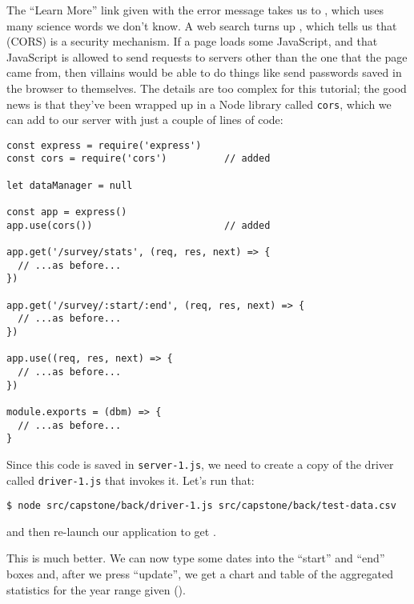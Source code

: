 \noindent
The ``Learn More'' link given with the error message takes us to
,
which uses many science words we don't know.
A web search turns up ,
which tells us that  (CORS)
is a security mechanism.
If a page loads some JavaScript,
and that JavaScript is allowed to send requests to servers other than the one that the page came from,
then villains would be able to do things like send passwords saved in the browser to themselves.
The details are too complex for this tutorial;
the good news is that they've been wrapped up in a Node library called \texttt{cors},
which we can add to our server with just a couple of lines of code:

\begin{verbatim}
const express = require('express')
const cors = require('cors')          // added

let dataManager = null

const app = express()
app.use(cors())                       // added

app.get('/survey/stats', (req, res, next) => {
  // ...as before...
})

app.get('/survey/:start/:end', (req, res, next) => {
  // ...as before...
})

app.use((req, res, next) => {
  // ...as before...
})

module.exports = (dbm) => {
  // ...as before...
}
\end{verbatim}

Since this code is saved in \texttt{server-1.js},
we need to create a copy of the driver called \texttt{driver-1.js} that invokes it.
Let's run that:

\begin{verbatim}
$ node src/capstone/back/driver-1.js src/capstone/back/test-data.csv
\end{verbatim}

\noindent
and then re-launch our application to get .


This is much better.
We can now type some dates into the ``start'' and ``end'' boxes and,
after we press ``update'',
we get a chart and table of the aggregated statistics for the year range given
().

